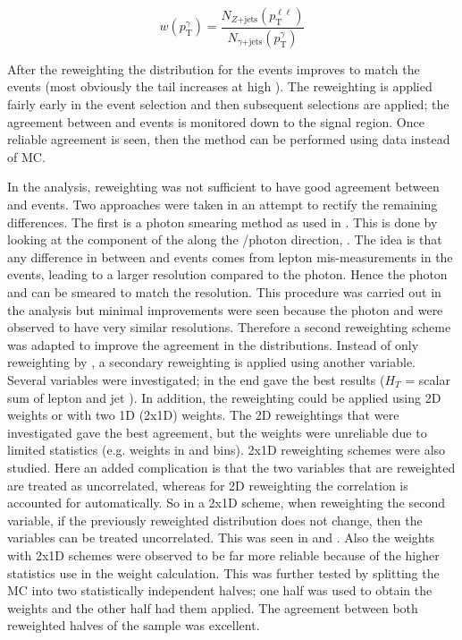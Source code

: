 \begin{equation}
w(p_\text{T}^\gamma) = \frac{N_{Z\text{+jets}}(p_\text{T}^{\ell\ell})}{N_{\gamma\text{+jets}}(p_\text{T}^\gamma)}
\end{equation}

\noindent After the reweighting the \etmiss distribution for the \gjets events improves to match the \Zjets events (most obviously the tail increases at high \etmiss). The reweighting is applied fairly early in the event selection and then subsequent selections are applied; the agreement between \gjets and \Zjets events is monitored down to the signal region. Once reliable agreement is seen, then the method can be performed using data instead of MC.

In the \monoZ analysis, \pt reweighting was not sufficient to have good agreement between \gjets and \Zjets events. Two approaches were taken in an attempt to rectify the remaining differences. The first is a photon smearing method as used in \cite{Galster:2151990}. This is done by looking at the component of the \etmiss along the \Z/photon direction, \etmisspar. The idea is that any difference in \etmisspar between \Zjets and \gjets events comes from lepton mis-measurements in the \Zjets events, leading to a larger \Z resolution compared to the photon. Hence the photon \pt and \etmisspar can be smeared to match the \Z resolution. This procedure was carried out in the \monoZ analysis but minimal improvements were seen because the photon and \Z were observed to have very similar resolutions. Therefore a second reweighting scheme was adapted to improve the agreement in the \etmiss distributions. Instead of only reweighting by \pt, a secondary reweighting is applied using another variable. Several variables were investigated; in the end \etmissht gave the best results ($H_T$ = scalar sum of lepton \pt and jet \pt). In addition, the reweighting could be applied using 2D weights or with two 1D (2x1D) weights. The 2D reweightings that were investigated gave the best \etmiss agreement, but the weights were unreliable due to limited statistics (e.g. weights in \pt and \etmissht bins). 2x1D reweighting schemes were also studied. Here an added complication is that the two variables that are reweighted are treated as uncorrelated, whereas for 2D reweighting the correlation is accounted for automatically. So in a 2x1D scheme, when reweighting the second variable, if the previously reweighted \pt distribution does not change, then the variables can be treated uncorrelated. This was seen in \pt and \etmissht. Also the weights with 2x1D schemes were observed to be far more reliable because of the higher statistics use in the weight calculation. This was further tested by splitting the \gjets MC into two statistically independent halves; one half was used to obtain the weights and the other half had them applied. The agreement between both reweighted halves of the \gjets sample was excellent. 

